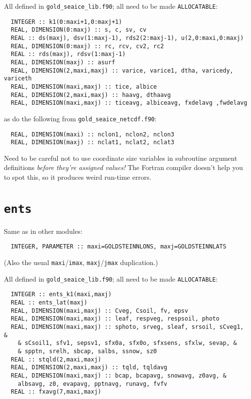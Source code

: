 \documentclass[a4paper,10pt,article]{memoir}
\begin{document}
All defined in \texttt{gold\_seaice\_lib.f90}; all need to be made
\texttt{ALLOCATABLE}:

\begin{verbatim}
  INTEGER :: k1(0:maxi+1,0:maxj+1)
  REAL, DIMENSION(0:maxj) :: s, c, sv, cv
  REAL :: ds(maxj), dsv(1:maxj-1), rds2(2:maxj-1), u(2,0:maxi,0:maxj)
  REAL, DIMENSION(0:maxj) :: rc, rcv, cv2, rc2
  REAL :: rds(maxj), rdsv(1:maxj-1)
  REAL, DIMENSION(maxj) :: asurf
  REAL, DIMENSION(2,maxi,maxj) :: varice, varice1, dtha, varicedy, variceth
  REAL, DIMENSION(maxi,maxj) :: tice, albice
  REAL, DIMENSION(2,maxi,maxj) :: haavg, dthaavg
  REAL, DIMENSION(maxi,maxj) :: ticeavg, albiceavg, fxdelavg ,fwdelavg
\end{verbatim}

as do the following from \texttt{gold\_seaice\_netcdf.f90}:

\begin{verbatim}
  REAL, DIMENSION(maxi) :: nclon1, nclon2, nclon3
  REAL, DIMENSION(maxj) :: nclat1, nclat2, nclat3
\end{verbatim}

Need to be careful not to use coordinate size variables in subroutine
argument definitions \emph{before they're assigned values!}  The
Fortran compiler doesn't help you to spot this, so it produces weird
run-time errors.

\section{\texttt{ents}}

Same as in other modules:

\begin{verbatim}
  INTEGER, PARAMETER :: maxi=GOLDSTEINNLONS, maxj=GOLDSTEINNLATS
\end{verbatim}

(Also the usual \texttt{maxi}/\texttt{imax},
\texttt{maxj}/\texttt{jmax} duplication.)

All defined in \texttt{gold\_seaice\_lib.f90}; all need to be made
\texttt{ALLOCATABLE}:

\begin{verbatim}
  INTEGER :: ents_k1(maxi,maxj)
  REAL :: ents_lat(maxj)
  REAL, DIMENSION(maxi,maxj) :: Cveg, Csoil, fv, epsv
  REAL, DIMENSION(maxi,maxj) :: leaf, respveg, respsoil, photo
  REAL, DIMENSION(maxi,maxj) :: sphoto, srveg, sleaf, srsoil, sCveg1, &
    & sCsoil1, sfv1, sepsv1, sfx0a, sfx0o, sfxsens, sfxlw, sevap, &
    & spptn, srelh, sbcap, salbs, ssnow, sz0
  REAL :: stqld(2,maxi,maxj)
  REAL, DIMENSION(2,maxi,maxj) :: tqld, tqldavg
  REAL, DIMENSION(maxi,maxj) :: bcap, bcapavg, snowavg, z0avg, &
    albsavg, z0, evapavg, pptnavg, runavg, fvfv
  REAL :: fxavg(7,maxi,maxj)
\end{verbatim}
\end{document}
